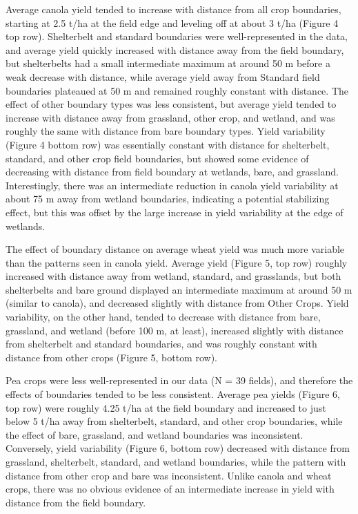 \documentclass[]{elsarticle} %
\begin{document}
Average canola yield tended to increase with distance from all crop boundaries, starting at 2.5 t/ha at the field edge and leveling off at about 3 t/ha (Figure 4 top row).
Shelterbelt and standard boundaries were well-represented in the data, and average yield quickly increased with distance away from the field boundary, but shelterbelts had a small intermediate maximum at around 50 m before a weak decrease with distance, while average yield away from Standard field boundaries plateaued at 50 m and remained roughly constant with distance.
The effect of other boundary types was less consistent, but average yield tended to increase with distance away from grassland, other crop, and wetland, and was roughly the same with distance from bare boundary types.
Yield variability (Figure 4 bottom row) was essentially constant with distance for shelterbelt, standard, and other crop field boundaries, but showed some evidence of decreasing with distance from field boundary at wetlands, bare, and grassland.
Interestingly, there was an intermediate reduction in canola yield variability at about 75 m away from wetland boundaries, indicating a potential stabilizing effect, but this was offset by the large increase in yield variability at the edge of wetlands.

The effect of boundary distance on average wheat yield was much more variable than the patterns seen in canola yield.
Average yield (Figure 5, top row) roughly increased with distance away from wetland, standard, and grasslands, but both shelterbelts and bare ground displayed an intermediate maximum at around 50 m (similar to canola), and decreased slightly with distance from Other Crops.
Yield variability, on the other hand, tended to decrease with distance from bare, grassland, and wetland (before 100 m, at least), increased slightly with distance from shelterbelt and standard boundaries, and was roughly constant with distance from other crops (Figure 5, bottom row).

Pea crops were less well-represented in our data (N = 39 fields), and therefore the effects of boundaries tended to be less consistent.
Average pea yields (Figure 6, top row) were roughly 4.25 t/ha at the field boundary and increased to just below 5 t/ha away from shelterbelt, standard, and other crop boundaries, while the effect of bare, grassland, and wetland boundaries was inconsistent.
Conversely, yield variability (Figure 6, bottom row) decreased with distance from grassland, shelterbelt, standard, and wetland boundaries, while the pattern with distance from other crop and bare was inconsistent.
Unlike canola and wheat crops, there was no obvious evidence of an intermediate increase in yield with distance from the field boundary.
\end{document}
